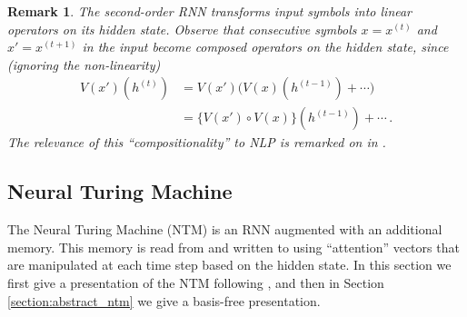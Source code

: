 \documentclass[english,letter paper,12pt,leqno]{article}
\theoremstyle{example}
\newtheorem{remark}[theorem]{Remark}
\numberwithin{equation}{section}
\begin{document}
\begin{remark}
The second-order RNN transforms input symbols into linear operators on its hidden state. Observe that consecutive symbols $x = x^{(t)}$ and $x' = x^{(t+1)}$ in the input become composed operators on the hidden state, since (ignoring the non-linearity)
\begin{align*}
V(x')(h^{(t)}) &= V(x')\big( V(x)(h^{(t-1)}) + \cdots)\\
&= \big\{ V(x') \circ V(x) \big\}( h^{(t-1)} ) + \cdots\,.
\end{align*}
The relevance of this ``compositionality'' to NLP is remarked on in \cite{irsoy}.
\end{remark}

\subsection{Neural Turing Machine}\label{example:ntm}

The Neural Turing Machine (NTM) \cite{ntm} is an RNN augmented with an additional memory. This memory is read from and written to using ``attention'' vectors that are manipulated at each time step based on the hidden state. In this section we first give a presentation of the NTM following \cite[\S 3]{ntm}, and then in Section \ref{section:abstract_ntm} we give a basis-free presentation.
\end{document}
